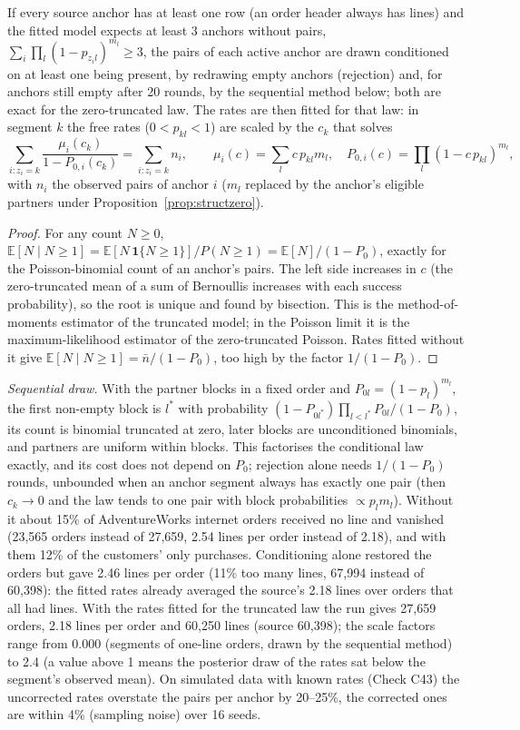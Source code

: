 \begin{proposition}\label{prop:occminone}
If every source anchor has at least one row (an order header always has lines) and the fitted model expects at least 3 anchors without pairs, $\sum_i\prod_l(1-p_{z_il})^{m_l}\ge3$, the pairs of each active anchor are drawn conditioned on at least one being present, by redrawing empty anchors (rejection) and, for anchors still empty after 20 rounds, by the sequential method below; both are exact for the zero-truncated law. The rates are then fitted for that law: in segment $k$ the free rates ($0<p_{kl}<1$) are scaled by the $c_k$ that solves
\[\sum_{i:z_i=k}\frac{\mu_i(c_k)}{1-P_{0,i}(c_k)}=\sum_{i:z_i=k}n_i,\qquad \mu_i(c)=\sum_l c\,p_{kl}m_l,\quad P_{0,i}(c)=\prod_l(1-c\,p_{kl})^{m_l},\]
with $n_i$ the observed pairs of anchor $i$ ($m_l$ replaced by the anchor's eligible partners under Proposition~\ref{prop:structzero}).
\end{proposition}
\begin{proof}
For any count $N\ge0$, $\mathbb E[N\mid N\ge1]=\mathbb E[N\,\mathbf 1\{N\ge1\}]/P(N\ge1)=\mathbb E[N]/(1-P_0)$, exactly for the Poisson-binomial count of an anchor's pairs. The left side increases in $c$ (the zero-truncated mean of a sum of Bernoullis increases with each success probability), so the root is unique and found by bisection. This is the method-of-moments estimator of the truncated model; in the Poisson limit it is the maximum-likelihood estimator of the zero-truncated Poisson. Rates fitted without it give $\mathbb E[N\mid N\ge1]=\bar n/(1-P_0)$, too high by the factor $1/(1-P_0)$.
\end{proof}
\noindent\emph{Sequential draw.} With the partner blocks in a fixed order and $P_{0l}=(1-p_l)^{m_l}$, the first non-empty block is $l^*$ with probability $(1-P_{0l^*})\prod_{l<l^*}P_{0l}/(1-P_0)$, its count is binomial truncated at zero, later blocks are unconditioned binomials, and partners are uniform within blocks. This factorises the conditional law exactly, and its cost does not depend on $P_0$; rejection alone needs $1/(1-P_0)$ rounds, unbounded when an anchor segment always has exactly one pair (then $c_k\to0$ and the law tends to one pair with block probabilities $\propto p_lm_l$).
\noindent Without it about 15\% of AdventureWorks internet orders received no line and vanished (23{,}565 orders instead of 27{,}659, 2.54 lines per order instead of 2.18), and with them 12\% of the customers' only purchases. Conditioning alone restored the orders but gave 2.46 lines per order (11\% too many lines, 67{,}994 instead of 60{,}398): the fitted rates already averaged the source's 2.18 lines over orders that all had lines. With the rates fitted for the truncated law the run gives 27{,}659 orders, 2.18 lines per order and 60{,}250 lines (source 60{,}398); the scale factors range from 0.000 (segments of one-line orders, drawn by the sequential method) to 2.4 (a value above 1 means the posterior draw of the rates sat below the segment's observed mean). On simulated data with known rates (Check C43) the uncorrected rates overstate the pairs per anchor by 20--25\%, the corrected ones are within 4\% (sampling noise) over 16 seeds.

